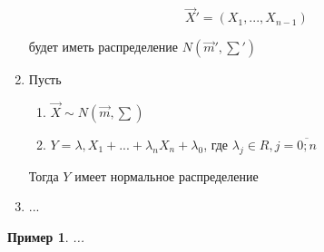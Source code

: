 \documentclass[a4paper, 14pt]{report}
\newtheorem{example}{Пример}[section]
\begin{document}
\begin{enumerate}
        $$
        \vec X' = (X_1,...,X_{n-1})
        $$

        будет иметь распределение $N(\vec m', \sum')$

    \item Пусть

        \begin{enumerate}
            \item $\vec X \sim N(\vec m, \sum)$
            \item $Y = \lambda, X_1 + ... + \lambda_nX_n + \lambda_0$, где $\lambda_j \in R, j = \overline{0;n}$
        \end{enumerate}

        Тогда $Y$ имеет нормальное распределение

    \item ...
\end{enumerate}

\begin{example}
    ...
\end{example}
\end{document}
